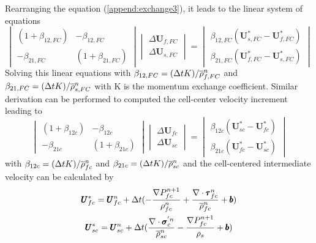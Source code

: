 \documentclass[preprint,12pt]{elsarticle}
\begin{document}
%
%
Rearranging the equation (\ref{append:exchange3}), it leads to the linear system of equations
%
\[ \begin{vmatrix} (1 + \beta_{12,FC})  &  -\beta_{12,FC} \\
                  -\beta_{21,FC}       &  (1 + \beta_{21,FC})
    \end {vmatrix}
    \begin{vmatrix} \Delta \pmb{U}_{f,FC} \\
                    \Delta \pmb{U}_{s,FC}
    \end {vmatrix}
    =
    \begin{vmatrix}  \beta_{12,FC}(\pmb{U}_{s,FC}^{*} - \pmb{U}_{f,FC}^{*}) \\
                    \beta_{21,FC}(\pmb{U}_{f,FC}^{*} - \pmb{U}_{s,FC}^{*})
    \end {vmatrix}                
\]
%
%
Solving this linear equations with $\beta_{12,FC} = (\Delta{t} K)/\overline{\rho}_{f,FC}^n$ and $\beta_{21,FC} = (\Delta{t} K)/\overline{\rho}_{s,FC}^n$ with K is the momentum exchange coefficient. Similar derivation can be performed to computed the cell-center velocity increment leading to
%
\[ \begin{vmatrix} (1 + \beta_{12c})  &  -\beta_{12c} \\
                  -\beta_{21c}       &  (1 + \beta_{21c})
    \end {vmatrix}
    \begin{vmatrix} \Delta \pmb{U}_{fc} \\
                    \Delta \pmb{U}_{sc}
    \end {vmatrix}
    =
    \begin{vmatrix}  \beta_{12c}(\pmb{U}_{sc}^{*} - \pmb{U}_{fc}^{*}) \\
                    \beta_{21c}(\pmb{U}_{fc}^{*} - \pmb{U}_{sc}^{*})
    \end {vmatrix}                
\]
%
%
with $\beta_{12c} = (\Delta{t} K)/\overline{\rho}_{fc}^n$ and $\beta_{21c} = (\Delta{t} K)/\overline{\rho}_{sc}^n$ and the cell-centered intermediate velocity can be calculated by
%
\begin{equation}
\begin{gathered}
\pmb{U}_{fc}^{*} = \pmb{U}_{fc}^{n} + \Delta{t} (-\frac{\nabla P_{fc}^{n+1}}{\rho_{fc}^n}  + \frac {\nabla \cdot \pmb{\tau}_{fc}^{n}}{\overline{\rho}^n_{fc}} + \pmb{b}) \\
\pmb{U}_{sc}^{*} = \pmb{U}_{sc}^{n} + \Delta{t} (\frac{\nabla \cdot \pmb{\sigma}_c^{'n}}{\overline{\rho}^n_{sc}}    - \frac{\nabla P_{fc}^{n+1}}{\rho_s}  + \pmb{b})
\end {gathered}
\end {equation}
\end{document}
